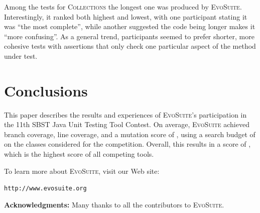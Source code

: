 \documentclass[10pt,conference]{IEEEtran}
\newcommand{\project}[1]{\textsc{#1}\xspace}
\newcommand{\Collections}{\project{Collections}}
\newcommand{\EVOSUITE}{\textsc{EvoSuite}\xspace}
\begin{document}
Among the tests for \Collections the longest one was produced by
\EVOSUITE.  Interestingly, it ranked both highest and lowest, with one
participant stating it was ``the most complete'', while another
suggested the code being longer makes it ``more confusing''. As a
general trend, participants seemed to prefer shorter, more cohesive
tests with assertions that only check one particular aspect of the
method under test.

\section{Conclusions}


This paper describes the results and experiences of \EVOSUITE's
participation in the 11th SBST Java Unit Testing Tool Contest. On
average, \EVOSUITE achieved \avgConditionsCoverageRatioLong branch
coverage, \avgLinesCoverageRatioLong line coverage, and a mutation
score of \avgMutantsCoverageRatioLong, using a search budget of
\budgetLong on the \cuts classes considered for the
competition. Overall, this results in a score of \score, which is the
highest score of all competing tools.


To learn more about \EVOSUITE, visit our Web site:
\begin{center}
\texttt{http://www.evosuite.org}
\end{center}



\textbf{Acknowledgments:} Many thanks to all the contributors to
\EVOSUITE.


\balance


\end{document}
